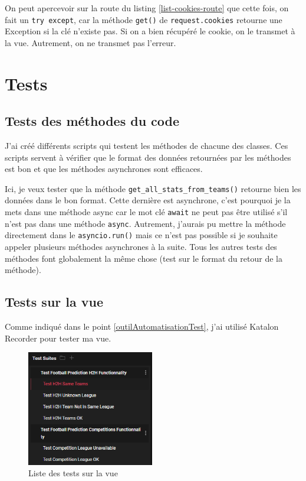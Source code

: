 \documentclass[a4paper,14pt]{extarticle}
\begin{document}
{

On peut apercevoir sur la route du listing \ref{list-cookies-route} que cette fois, on fait un \texttt{try except}, car la méthode \texttt{get()} de \texttt{request.cookies} retourne une Exception si la clé n'existe pas. Si on a bien récupéré le cookie, on le transmet à la vue. Autrement, on ne transmet pas l'erreur.

\newpage

\section{Tests}

\subsection{Tests des méthodes du code}

J'ai créé différents scripts qui testent les méthodes de chacune des classes. Ces scripts servent à vérifier que le format des données retournées par les méthodes est bon et que les méthodes asynchrones sont efficaces.


Ici, je veux tester que la méthode \texttt{get\_all\_stats\_from\_teams()} retourne bien les données dans le bon format. Cette dernière est asynchrone, c'est pourquoi je la mets dans une méthode async car le mot clé \texttt{await} ne peut pas être utilisé s'il n'est pas dans une méthode \texttt{async}. Autrement, j'aurais pu mettre la méthode directement dans le \texttt{asyncio.run()} mais ce n'est pas possible si je souhaite appeler plusieurs méthodes asynchrones à la suite.
Tous les autres tests des méthodes font globalement la même chose (test sur le format du retour de la méthode).

\subsection{Tests sur la vue}

Comme indiqué dans le point \ref{outilAutomatisationTest}, j'ai utilisé Katalon Recorder pour tester ma vue.

\begin{figure}[htp]
    \centering
    \includegraphics[width=15em]{../img/katalonTestsSurVue.png}
    \caption{Liste des tests sur la vue}
    \label{fig:predictionMadeH2H}
\end{figure}

}
\end{document}
